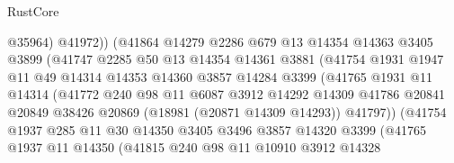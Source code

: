\begin{lexlean}{RustCore}
\begin{coremodule}
                              @35964)
                            @41972))
                        (@41864
                          @14279
                          @2286
                          @679
                          @13
                          @14354
                          @14363
                          @3405
                          @3899
                          (@41747
                            @2285
                            @50
                            @13
                            @14354
                            @14361
                            @3881
                            (@41754
                              @1931
                              @1947
                              @11
                              @49
                              @14314
                              @14353
                              @14360
                              @3857
                              @14284
                              @3399
                              (@41765
                                @1931
                                @11
                                @14314
                                (@41772
                                  @240
                                  @98
                                  @11
                                  @6087
                                  @3912
                                  @14292
                                  @14309
                                  @41786
                                  @20841
                                  @20849
                                  @38426
                                  @20869
                                  (@18981 (@20871 @14309 @14293))
                                  @41797))
                              (@41754
                                @1937
                                @285
                                @11
                                @30
                                @14350
                                @3405
                                @3496
                                @3857
                                @14320
                                @3399
                                (@41765
                                  @1937
                                  @11
                                  @14350
                                  (@41815
                                    @240
                                    @98
                                    @11
                                    @10910
                                    @3912
                                    @14328

\end{coremodule}
\end{lexlean}
